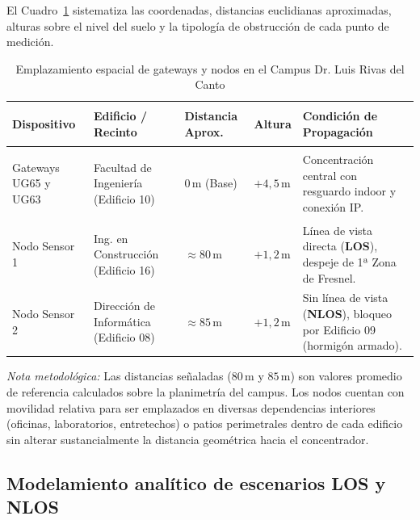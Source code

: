 \documentclass[12pt,oneside,openany,spanish,oldfontcommands]{memoir}
\begin{document}
El Cuadro~\ref{tab:despliegue-espacial} sistematiza las coordenadas, distancias euclidianas aproximadas,
alturas sobre el nivel del suelo y la tipología de obstrucción de cada punto de medición.

\begin{table}[!htbp]
\centering
\caption{Emplazamiento espacial de gateways y nodos en el Campus Dr. Luis Rivas del Canto}\label{tab:despliegue-espacial}
\small
\setlength{\tabcolsep}{3pt}
\begin{tabularx}{\textwidth}{>{\bfseries\raggedright\arraybackslash}p{2.3cm} >{\raggedright\arraybackslash}p{3.2cm} >{\centering\arraybackslash}p{2.2cm} >{\centering\arraybackslash}p{1.4cm} >{\raggedright\arraybackslash}X}
\toprule
\textbf{Dispositivo} & \textbf{Edificio / Recinto} & \textbf{Distancia Aprox.} & \textbf{Altura} & \textbf{Condición de Propagación} \\
\midrule
Gateways UG65 y UG63 & Facultad de Ingeniería (Edificio 10) & $0\,\text{m}$ (Base) & $+4,5\,\text{m}$ & Concentración central con resguardo indoor y conexión IP. \\
\midrule
Nodo Sensor 1 & Ing. en Construcción (Edificio 16) & $\approx 80\,\text{m}$ & $+1,2\,\text{m}$ & Línea de vista directa (\textbf{LOS}), despeje de 1ª Zona de Fresnel. \\
\midrule
Nodo Sensor 2 & Dirección de Informática (Edificio 08) & $\approx 85\,\text{m}$ & $+1,2\,\text{m}$ & Sin línea de vista (\textbf{NLOS}), bloqueo por Edificio 09 (hormigón armado). \\
\bottomrule
\end{tabularx}
\vspace{0.1cm}
\footnotesize
\textit{Nota metodológica:} Las distancias señaladas ($80\,\text{m}$ y $85\,\text{m}$) son valores promedio de referencia calculados sobre la planimetría del campus. Los nodos cuentan con movilidad relativa para ser emplazados en diversas dependencias interiores (oficinas, laboratorios, entretechos) o patios perimetrales dentro de cada edificio sin alterar sustancialmente la distancia geométrica hacia el concentrador.
\end{table}

\subsection{Modelamiento analítico de escenarios LOS y NLOS}
\end{document}
